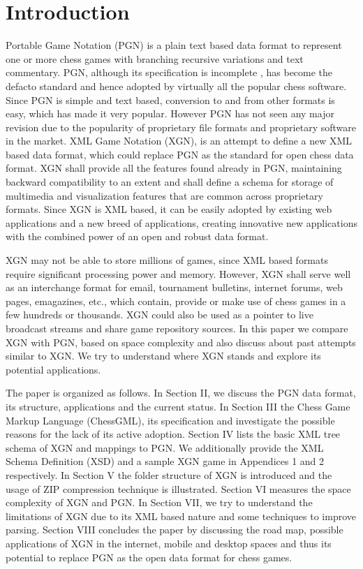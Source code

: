 \documentclass[conference]{IEEEtran}
\begin{document}
\section{Introduction}
Portable Game Notation (PGN) is a plain text based data format to represent one or more chess games with branching recursive variations and text commentary. PGN, although its specification is incomplete \cite{ab01}, has become the de\textendash facto standard and hence adopted by virtually all the popular chess software. Since PGN is simple and text based, conversion to and from other formats is easy, which has made it very popular. However PGN has not seen any major revision due to the popularity of proprietary file formats and proprietary software in the market. XML Game Notation (XGN), is an attempt to define a new XML based data format, which could replace PGN as the standard for open chess data format. XGN shall provide all the features found already in PGN, maintaining backward compatibility to an extent and shall define a schema for storage of multimedia and visualization features that are common across proprietary formats. Since XGN is XML based, it can be easily adopted by existing web applications and a new breed of applications, creating innovative new applications with the combined power of an open and robust data format.

XGN may not be able to store millions of games, since XML based formats require significant processing power and memory. However, XGN shall serve well as an interchange format for e\textendash mail, tournament bulletins, internet forums, web pages, e\textendash magazines, etc., which contain, provide or make use of chess games in a few hundreds or thousands. XGN could also be used as a pointer to live broadcast streams and share game repository sources. In this paper we compare XGN with PGN, based on space complexity and also discuss about past attempts similar to XGN. We try to understand where XGN stands and explore its potential applications.

The paper is organized as follows. In Section II, we discuss the PGN data format, its structure, applications and the current status. In Section III the Chess Game Markup Language (ChessGML), its specification and investigate the possible reasons for the lack of its active adoption. Section IV lists the basic XML tree schema of XGN and mappings to PGN. We additionally provide the XML Schema Definition (XSD) and a sample XGN game in Appendices 1 and 2 respectively. In Section V the folder structure of XGN is introduced and the usage of ZIP compression technique is illustrated. Section VI measures the space complexity of XGN and PGN. In Section VII, we try to understand the limitations of XGN due to its XML based nature and some techniques to improve parsing. Section VIII concludes the paper by discussing the road map, possible applications of XGN in the internet, mobile and desktop spaces and thus its potential to replace PGN as the open data format for chess games.
\end{document}
